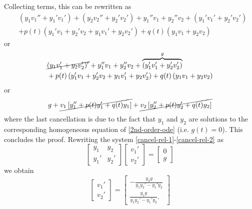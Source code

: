\documentclass[12pt,reqno]{amsart}
\numberwithin{equation}{section}  %
\numberwithin{figure}{section}
\theoremstyle{plain}
\theoremstyle{definition}
\theoremstyle{remark}
\begin{document}
%
Collecting terms, this can be rewritten as
%
%
%
%
\begin{equation*}
\begin{split}
  & (y_{1}v_{1}'' + y_{1}' v_{1}') + (y_{2}v_{2}'' + y_{2}' v_{2}') + y_{1}''
  v_{1} + y_{2}'' v_{2} + (y_{1}'v_{1}' + y_{2}' v_{2}')
  \\
  & + p(t)\left(
  y_{1}'v_{1} + y_{2}' v_{2} + y_{1}v_{1}' + y_{2}v_{2}'
  \right) + q(t)\left( y_{1}v_{1} + y_{2}v_{2} \right)
  \end{split}
\end{equation*}
%
or
%
%
%
%
\begin{equation*}
\begin{split}
  & \cancel{(y_{1}v_{1}' + y_{2}v_{2}')'} + y_{1}''
  v_{1} + y_{2}'' v_{2} + \overbrace{(y_{1}'v_{1}' + y_{2}' v_{2}')}^{g}
  \\
  & + p(t)\left(
  y_{1}'v_{1} + y_{2}' v_{2} + y_{1}v_{1}' + y_{2}v_{2}'
  \right) + q(t)\left( y_{1}v_{1} + y_{2}v_{2} \right)
  \end{split}
\end{equation*}
%
%
or
%
%
\begin{equation*}
\begin{split}
  g + \cancel{v_{1}\left[ y_{1}'' + p(t)y_{1}' + q(t)y_{1} \right]} +
  \cancel{v_{2}\left[ y_{2}'' + p(t)y_{2}' + q(t)y_{2}
  \right]}
\end{split}
\end{equation*}
%
%
where the last cancellation is due to the fact that $y_{1}$ and $y_{2}$ are
solutions to the corresponding homogeneous equation of \eqref{2nd-order-ode}
(i.e. $g(t) = 0$). This concludes the proof. \qquad \qedsymbol
%
%
Rewriting the system \eqref{cancel-rel-1}-\eqref{cancel-rel-2}
as
  \begin{equation*}
  \begin{bmatrix}
    y_{1} & y_{2} \\
    y_{1}' & y_{2}'
  \end{bmatrix}
  \begin{bmatrix}
    v_{1}'
    \\
    v_{2}'
  \end{bmatrix}=
  \begin{bmatrix}
  0 \\
  g
  \end{bmatrix}
\end{equation*}
  we obtain 
  \begin{equation*}
\begin{bmatrix}
  v_{1}'
  \\
  v_{2}'
\end{bmatrix}=
\begin{bmatrix}
  -\frac{y_{2}g}{y_{1}y_{2}' - y_{1}' y_{2}} \\
  \frac{y_{1}g}{y_{1}y_{2}' - y_{1}' y_{2}}.
\end{bmatrix}
\end{equation*}
\end{document}
